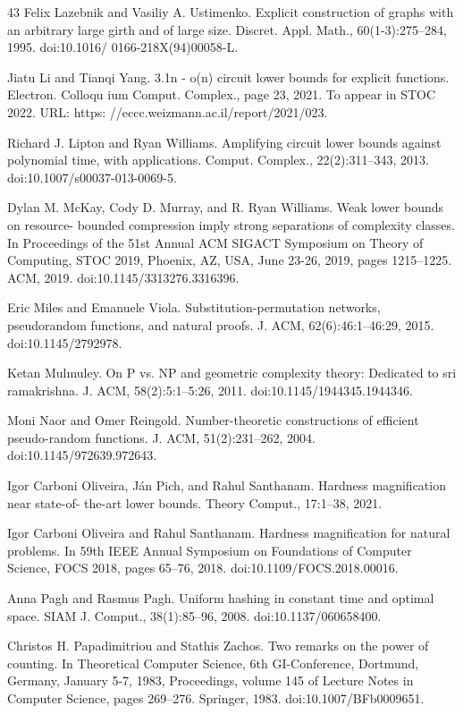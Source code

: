 \documentclass[10pt,a4paper]{article}
\begin{document}
\begin{thebibliography}{43}
Felix Lazebnik and Vasiliy A. Ustimenko. Explicit construction of graphs with an arbitrary large girth and of large size. Discret. Appl. Math., 60(1-3):275–284, 1995. doi:10.1016/ 0166-218X(94)00058-L.

Jiatu Li and Tianqi Yang. 3.1n - o(n) circuit lower bounds for explicit functions. Electron. Colloqu ium Comput. Complex., page 23, 2021. To appear in STOC 2022. URL: https: //eccc.weizmann.ac.il/report/2021/023.

Richard J. Lipton and Ryan Williams. Amplifying circuit lower bounds against polynomial time, with applications. Comput. Complex., 22(2):311–343, 2013. doi:10.1007/s00037-013-0069-5.

Dylan M. McKay, Cody D. Murray, and R. Ryan Williams. Weak lower bounds on resource- bounded compression imply strong separations of complexity classes. In Proceedings of the 51st Annual ACM SIGACT Symposium on Theory of Computing, STOC 2019, Phoenix, AZ, USA, June 23-26, 2019, pages 1215–1225. ACM, 2019. doi:10.1145/3313276.3316396.

Eric Miles and Emanuele Viola. Substitution-permutation networks, pseudorandom functions, and natural proofs. J. ACM, 62(6):46:1–46:29, 2015. doi:10.1145/2792978.

Ketan Mulmuley. On P vs. NP and geometric complexity theory: Dedicated to sri ramakrishna. J. ACM, 58(2):5:1–5:26, 2011. doi:10.1145/1944345.1944346.

Moni Naor and Omer Reingold. Number-theoretic constructions of efficient pseudo-random functions. J. ACM, 51(2):231–262, 2004. doi:10.1145/972639.972643.

Igor Carboni Oliveira, Ján Pich, and Rahul Santhanam. Hardness magnification near state-of- the-art lower bounds. Theory Comput., 17:1–38, 2021.

Igor Carboni Oliveira and Rahul Santhanam. Hardness magnification for natural problems. In 59th IEEE Annual Symposium on Foundations of Computer Science, FOCS 2018, pages 65–76, 2018. doi:10.1109/FOCS.2018.00016.

Anna Pagh and Rasmus Pagh. Uniform hashing in constant time and optimal space. SIAM J. Comput., 38(1):85–96, 2008. doi:10.1137/060658400.

Christos H. Papadimitriou and Stathis Zachos. Two remarks on the power of counting. In Theoretical Computer Science, 6th GI-Conference, Dortmund, Germany, January 5-7, 1983, Proceedings, volume 145 of Lecture Notes in Computer Science, pages 269–276. Springer, 1983. doi:10.1007/BFb0009651.


\end{thebibliography}
\end{document}
